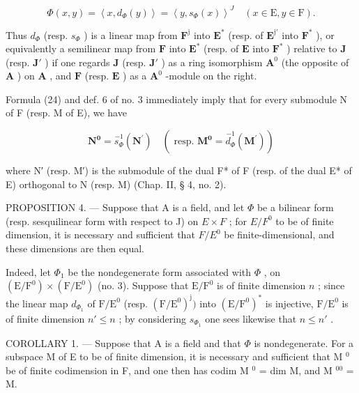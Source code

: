 \[
\Phi (x, y) = \left\langle x, d _ {\Phi} (y) \right\rangle = \left\langle y, s _ {\Phi} (x) \right\rangle^ {J} \quad (x \in \mathrm{E}, y \in \mathrm{F}).\tag{24}
\]

Thus \(d_{\Phi}\) (resp. \(s_{\Phi}\) ) is a linear map from \(\mathbf{F}^{\mathrm{j}}\) into \(\mathbf{E}^{*}\) (resp. of \(\mathbf{E}^{\mathrm{j}'}\) into \(\mathbf{F}^{*}\) ), or equivalently a semilinear map from \(\mathbf{F}\) into \(\mathbf{E}^{*}\) (resp. of \(\mathbf{E}\) into \(\mathbf{F}^{*}\) ) relative to \(\mathbf{J}\) (resp. \(\mathbf{J}'\) ) if one regards \(\mathbf{J}\) (resp. \(\mathbf{J}'\) ) as a ring isomorphism \(\mathbf{A}^{0}\) (the opposite of \(\mathbf{A}\) ) on \(\mathbf{A}\) , and \(\mathbf{F}\) (resp. \(\mathbf{E}\) ) as a \(\mathbf{A}^{0}\) -module on the right.

Formula (24) and def. 6 of no. 3 immediately imply that for every submodule N of F (resp. M of E), we have

\[
\mathbf {N ^ {0}} = \stackrel {- 1} {s _ {\Phi}} (\mathbf {N ^ {\prime}}) \quad (\text { resp. } \mathbf {M ^ {0}} = \stackrel {- 1} {d _ {\Phi}} (\mathbf {M ^ {\prime}}))\tag{25}
\]

where N′ (resp. M′) is the submodule of the dual F* of F (resp. of the dual E* of E) orthogonal to N (resp. M) (Chap. II, § 4, no. 2).

PROPOSITION 4. --- Suppose that A is a field, and let \(\Phi\) be a bilinear form (resp. sesquilinear form with respect to J) on \(E \times F\) ; for \(E/F^{0}\) to be of finite dimension, it is necessary and sufficient that \(F/E^{0}\) be finite-dimensional, and these dimensions are then equal.

Indeed, let \(\Phi_{1}\) be the nondegenerate form associated with \(\Phi\) , on \((\mathrm{E} / \mathrm{F}^{0}) \times (\mathrm{F} / \mathrm{E}^{0})\) (no. 3). Suppose that \(\mathrm{E} / \mathrm{F}^{0}\) is of finite dimension \(n\) ; since the linear map \(d_{\Phi_1}\) of \(\mathrm{F} / \mathrm{E}^{0}\) (resp. \((\mathrm{F} / \mathrm{E}^{0})^{\mathrm{j}})\) into \((\mathrm{E} / \mathrm{F}^{0})^{*}\) is injective, \(\mathrm{F} / \mathrm{E}^{0}\) is of finite dimension \(n' \leqslant n\) ; by considering \(s_{\Phi_1}\) one sees likewise that \(n \leqslant n'\) .

COROLLARY 1. --- Suppose that A is a field and that \(\Phi\) is nondegenerate. For a subspace M of E to be of finite dimension, it is necessary and sufficient that M \(^{0}\) be of finite codimension in F, and one then has codim M \(^{0}\) = dim M, and M \(^{00}\) = M.


